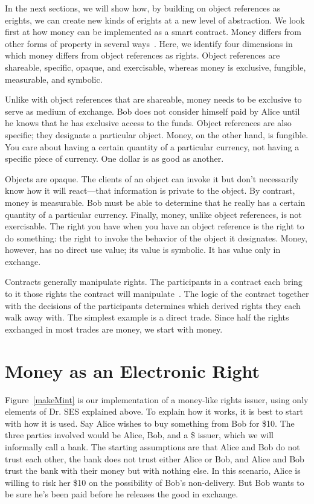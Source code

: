 \documentclass{llncs}
\begin{document}
In the next sections, we will show how, by building on object references as erights, we can create new kinds of erights at a new level of abstraction. We look first at how money can be implemented as a smart contract. Money differs from other forms of property in several ways~\cite{fox_property_2008}.  Here, we identify four dimensions in which money differs from object references as rights. Object references are shareable, specific, opaque, and exercisable, whereas money is exclusive, fungible, measurable, and symbolic.

Unlike with object references that are shareable, money needs to be exclusive to serve as medium of exchange. Bob does not consider himself paid by Alice until he knows that he has exclusive access to the funds. Object references are also specific; they designate a particular object. Money, on the other hand, is fungible. You care about having a certain quantity of a particular currency, not having a specific piece of currency. One dollar is as good as another. 

Objects are opaque. The clients of an object can invoke it but don't necessarily know how it will react---that information is private to the object. By contrast, money is measurable. Bob must be able to determine that he really has a certain quantity of a particular currency. Finally, money, unlike object references, is not exercisable. The right you have when you have an object reference is the right to do something: the right to invoke the behavior of the object it designates. Money, however, has no direct use value; its value is symbolic. It has value only in exchange.


Contracts generally manipulate rights. The participants in a contract each bring to it those rights the contract will manipulate~\cite{barnett_consent_1986}. The logic of the contract together with the decisions of the participants determines which derived rights they each walk away with. The simplest example is a direct trade. Since half the rights exchanged in most trades are money, we start with money.


\section{Money as an Electronic Right}
\label{money}

Figure~\ref{makeMint}  is our implementation of a money-like rights issuer, using only elements of Dr. SES explained above. To explain how it works, it is best to start with how it is used. Say Alice wishes to buy something from Bob for \$10. The three parties involved would be Alice, Bob, and a \$ issuer, which we will informally call a bank. The starting assumptions are that Alice and Bob do not trust each other, the bank does not trust either Alice or Bob, and Alice and Bob trust the bank with their money but with nothing else. In this scenario, Alice is willing to risk her \$10 on the possibility of Bob's non-delivery. But Bob wants to be sure he's been paid before he releases the good in exchange.
\end{document}
